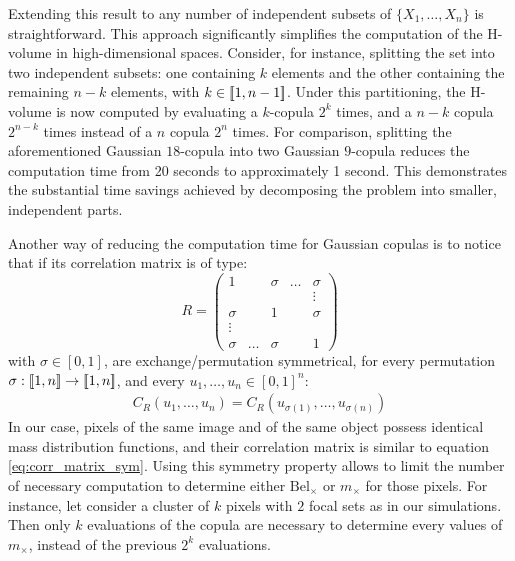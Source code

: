 Extending this result to any number of independent subsets of $\{X_1, \dots, X_n\}$ is straightforward. This approach significantly simplifies the computation of the H-volume in high-dimensional spaces. Consider, for instance, splitting the set into two independent subsets: one containing $k$ elements and the other containing the remaining $n - k$ elements, with $k\in{[\![}1, n-1{]\!]}$. Under this partitioning, the H-volume is now computed by evaluating a $k$-copula $2^k$ times, and a $n-k$ copula $2^{n-k}$ times instead of a $n$ copula $2^n$ times.
For comparison, splitting the aforementioned Gaussian $18$-copula into two Gaussian $9$-copula reduces the computation time from 20 seconds to approximately 1 second. This demonstrates the substantial time savings achieved by decomposing the problem into smaller, independent parts.

Another way of reducing the computation time for Gaussian copulas is to notice that if its correlation matrix is of type:
\begin{equation}
    R=\begin{pmatrix}
        1 &  & \sigma & \dots & \sigma\\
         & & & & \vdots\\
        \sigma &  & 1 & & \sigma\\
        \vdots &  &  & & \\
        \sigma & \dots & \sigma &  & 1
    \end{pmatrix}\label{eq:corr_matrix_sym}
\end{equation}
with $\sigma\in[0,1]$, are exchange/permutation symmetrical, \ie for every permutation $\sigma:{[\![} 1, n{]\!]}\rightarrow{[\![} 1, n{]\!]}$, and every $u_1,\dots,u_n\in[0,1]^n$:
\begin{eqnarray*}
    C_R(u_1,\dots, u_n) = C_R(u_{\sigma(1)} ,\dots, u_{\sigma(n)})
\end{eqnarray*}
In our case, pixels of the same image and of the same object possess identical mass distribution functions, and their correlation matrix is similar to equation \eqref{eq:corr_matrix_sym}. Using this symmetry property allows to limit the number of necessary computation to determine either $\mathrm{Bel}_\times$ or $m_\times$ for those pixels. For instance, let consider a cluster of $k$ pixels with $2$ focal sets as in our simulations. Then only $k$ evaluations of the copula are necessary to determine every values of $m_\times$, instead of the previous $2^k$ evaluations.

